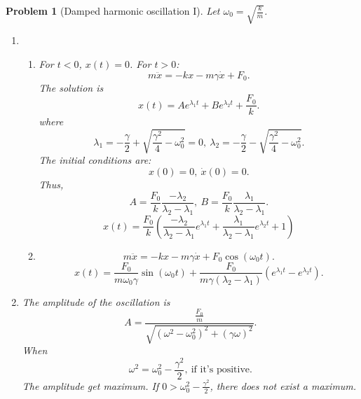\documentclass{article}
\theoremstyle{1}
\newtheorem{problem}{Problem}
\begin{document}
\begin{problem}[Damped harmonic oscillation I]
    Let $\omega_0=\sqrt{\frac{k}{m}}$.
    \begin{enumerate}
        \item \begin{enumerate}
            \item  For $t<0$, $x(t)=0$. For $t>0$:
            \begin{equation}
                m\ddot{x}=-kx-m\gamma\dot{x}+F_0.
            \end{equation}
            The solution is 
            \begin{equation}
                x(t)=Ae^{\lambda_1t}+Be^{\lambda_2t}+\frac{F_0}{k}.
            \end{equation}
            where
            \begin{equation}
                \lambda_1=-\frac{\gamma}{2}+\sqrt{\frac{\gamma^2}{4}-\omega_0^2}=0,\ \lambda_2=-\frac{\gamma}{2}-\sqrt{\frac{\gamma^2}{4}-\omega_0^2}.
            \end{equation}
            The initial conditions are:
            \begin{equation}
                x(0)=0,\ \dot{x}(0)=0.
            \end{equation}
            Thus,
            \begin{equation}
                A=\frac{F_0}{k}\frac{-\lambda_2}{\lambda_2-\lambda_1},\ B=\frac{F_0}{k}\frac{\lambda_1}{\lambda_2-\lambda_1}.
            \end{equation}
            \begin{equation}
                \boxed{x(t)=\frac{F_0}{k}\left(\frac{-\lambda_2}{\lambda_2-\lambda_1}e^{\lambda_1t}+\frac{\lambda_1}{\lambda_2-\lambda_1}e^{\lambda_2t}+1\right)}
            \end{equation}
            \item \begin{equation}
               m\ddot{x}=-kx-m\gamma\dot{x}+F_0\cos\left(\omega_0 t\right). 
            \end{equation}
            \begin{equation}
                x(t)=\frac{F_0}{m\omega_0\gamma}\sin\left(\omega_0 t\right)+\frac{F_0}{m\gamma\left(\lambda_2-\lambda_1\right)}\left(e^{\lambda_1t}-e^{\lambda_2t}\right).
            \end{equation}
        \end{enumerate}
        \item The amplitude of the oscillation is
        \begin{equation}
        A=\frac{\frac{F_0}{m}}{\sqrt{\left(\omega^2-\omega_0^2\right)^2+\left(\gamma\omega\right)^2}}.
        \end{equation}
        When 
        \begin{equation}
            \boxed{\omega^2=\omega_0^2-\frac{\gamma^2}{2}},\ \text{if it's positive.} 
        \end{equation}
        The amplitude get maximum. If $0>\omega_0^2-\frac{\gamma^2}{2}$, there does not exist a maximum.
    \end{enumerate}
\end{problem}
\end{document}
